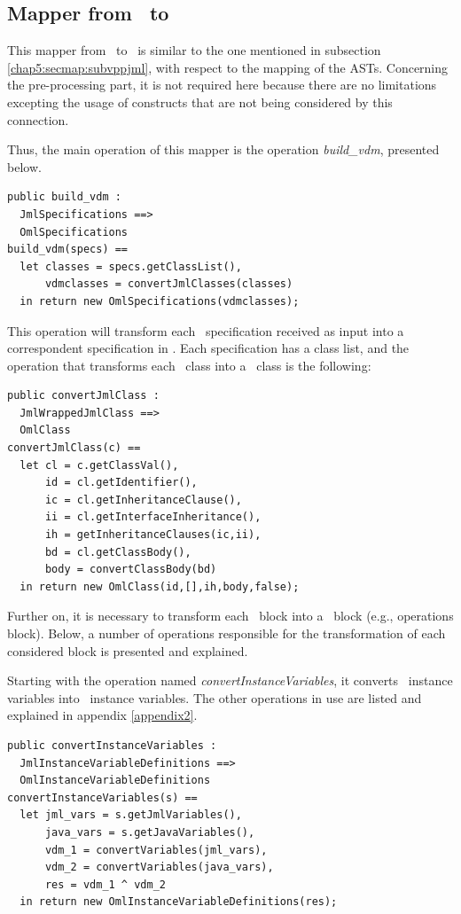 \subsection{Mapper from \jml\ to \vpp}

This mapper from \jml\ to \vpp\ is similar to the one mentioned in subsection \ref{chap5:secmap:subvppjml}, with respect to the mapping of the ASTs. Concerning the pre-processing part, it is not required here because there are no limitations excepting the usage of constructs that are not being considered by this connection.

Thus, the main operation of this mapper is the operation \textit{build\_vdm}, presented below.

\lstset{style=mystyle}
\bigskip
\begin{lstlisting}
public build_vdm : 
  JmlSpecifications ==>
  OmlSpecifications
build_vdm(specs) ==
  let classes = specs.getClassList(),
      vdmclasses = convertJmlClasses(classes)
  in return new OmlSpecifications(vdmclasses);
\end{lstlisting}
\bigskip

This operation will transform each \jml\ specification received as input into a correspondent specification in \vpp. Each specification has a class list, and the operation that transforms each \jml\ class into a \vpp\ class is the following:

\lstset{style=mystyle}
\bigskip
\begin{lstlisting}
public convertJmlClass :
  JmlWrappedJmlClass ==>
  OmlClass
convertJmlClass(c) ==
  let cl = c.getClassVal(),
      id = cl.getIdentifier(),
      ic = cl.getInheritanceClause(),
      ii = cl.getInterfaceInheritance(),
      ih = getInheritanceClauses(ic,ii),
      bd = cl.getClassBody(),
      body = convertClassBody(bd)
  in return new OmlClass(id,[],ih,body,false);
\end{lstlisting}
\bigskip

Further on, it is necessary to transform each \jml\ block into a \vpp\ block (e.g., operations block). Below, a number of operations responsible for the transformation of each considered block is presented and explained.

Starting with the operation named \textit{convertInstanceVariables}, it converts \jml\ instance variables into \vpp\ instance variables. The other operations in use are listed and explained in appendix \ref{appendix2}.

\bigskip
\begin{lstlisting}
public convertInstanceVariables :
  JmlInstanceVariableDefinitions ==>
  OmlInstanceVariableDefinitions
convertInstanceVariables(s) == 
  let jml_vars = s.getJmlVariables(),
      java_vars = s.getJavaVariables(),
	  vdm_1 = convertVariables(jml_vars),
	  vdm_2 = convertVariables(java_vars),
	  res = vdm_1 ^ vdm_2
  in return new OmlInstanceVariableDefinitions(res);
\end{lstlisting}
\bigskip


